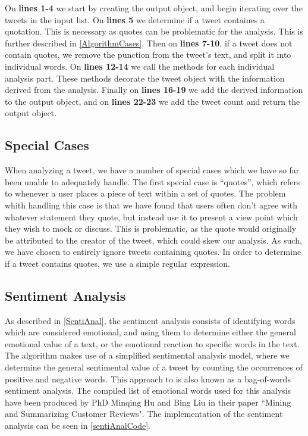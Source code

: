 On \textbf{lines 1-4} we start by creating the output object, and begin
iterating over the tweets in the input list. On \textbf{lines 5} we
determine if a tweet containes a quotation. This is necessary as quotes can be
problematic for the analysis. This is further described in
\autoref{AlgorithmCases}. Then on \textbf{lines 7-10}, if a tweet does not
contain quotes, we remove the punction from the tweet's text, and split it into
individual words. On \textbf{lines 12-14} we call the methods for each
individual analysis part. These methods decorate the tweet object with the
information derived from the analysis. Finally on \textbf{lines 16-19} we add
the derived information to the output object, and on \textbf{lines 22-23} we add
the tweet count and return the output object.

\subsection{Special Cases}\label{AlgorithmCases}
When analyzing a tweet, we have a number of special cases which we have so far
been unable to adequately handle. The first special case is ``quotes'', which refers
to whenever a user places a piece of text within a set of quotes. The problem
whith handling this case is that we have found that users often don't agree
with whatever statement they quote, but instead use it to present a view point
which they wish to mock or discuss. This is problematic, as the quote would
originally be attributed to the creator of the tweet, which could skew our
analysis. As such, we have chosen to entirely ignore tweets containing quotes.
In order to determine if a tweet contains quotes, we use a simple regular
expression.

\subsection{Sentiment Analysis}
As described in \autoref{SentiAnal}, the sentiment analysis consists of
identifying words which are considered emotional, and using them to determine
either the general emotional value of a text, or the emotional reaction to
specific words in the text. The algorithm makes use of a simplified sentimental
analysis model, where we determine the general sentimental value of a tweet by
counting the occurrences of positive and negative words. This approach to is
also known as a bag-of-words sentiment analysis\citep{BagOfWords}. The
compiled list of emotional words used for this analysis have been produced by
PhD Minqing Hu and Bing Liu in their paper ``Mining and Summarizing Customer
Reviews"\citep{Hu:2004:MSC:1014052.1014073}. The implementation of the sentiment
analysis can be seen in \autoref{sentiAnalCode}.\\

